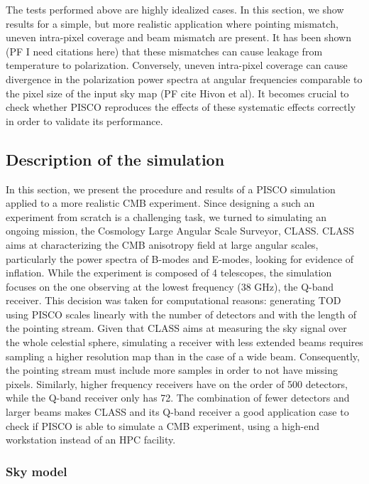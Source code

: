 \documentclass[a4paper,11pt]{article}
\begin{document}
The tests performed above are highly idealized cases. In this section, we show results for a simple, but more realistic application where pointing mismatch, uneven intra-pixel coverage and beam mismatch are present. It has been shown (PF I need citations here) that these mismatches can cause leakage from temperature to polarization. Conversely, uneven intra-pixel coverage can cause divergence in the polarization power spectra at angular frequencies comparable to the pixel size of the input sky map (PF cite Hivon et al). It becomes crucial to check whether PISCO reproduces the effects of these systematic effects correctly in order to validate its performance.
 
\subsection{Description of the simulation}

In this section, we present the procedure and results of a PISCO simulation applied to a more realistic CMB experiment. Since designing a such an experiment from scratch is a challenging task, we turned to simulating an ongoing mission, the Cosmology Large Angular Scale Surveyor, CLASS\cite{2016SPIE.9914E..1KH}. CLASS aims at characterizing the CMB anisotropy field at large angular scales, particularly the power spectra of B-modes and E-modes, looking for evidence of inflation. While the experiment is composed of 4 telescopes, the simulation focuses on the one observing at the lowest frequency (38 GHz), the Q-band receiver. This decision was taken for computational reasons: generating TOD using PISCO scales linearly with the number of detectors and with the length of the pointing stream. Given that CLASS aims at measuring the sky signal over the whole celestial sphere, simulating a receiver with less extended beams requires sampling a higher resolution map than in the case of a wide beam. Consequently, the pointing stream must include more samples in order to not have missing pixels. Similarly, higher frequency receivers have on the order of 500 detectors, while the Q-band receiver only has 72. The combination of fewer detectors and larger beams makes CLASS and its Q-band receiver a good application case to check if PISCO is able to simulate a CMB experiment, using a high-end workstation instead of an HPC facility.

\subsubsection{Sky model}
\end{document}

